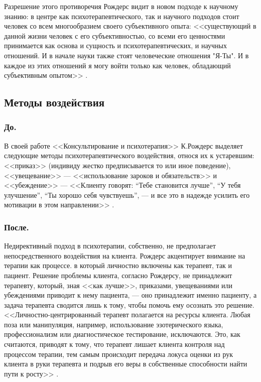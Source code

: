 \documentclass{../../common/thesisbyxetex}
\begin{document}
Разрешение этого противоречия Рождерс видит в новом подходе к научному знанию: в центре как 
психотерапевтического, так и научного подходов стоит человек со всем многообразием своего 
субъективного опыта: <<существующий в данной жизни человек с его субъективностью, со всеми его 
ценностями принимается как основа и сущность и психотерапевтических, и научных отношений. И в начале 
науки также стоят человеческие отношения "Я-Ты". И в каждое из этих отношений я могу войти только 
как человек, обладающий субъективным опытом>> \cite{rogersbec}.

 \subsection*{Методы воздействия}
 
\subsubsection*{До.} В своей работе <<Консультирование и психотерапия>> К.Рождерс выделяет следующие 
методы 
психотерапевтического воздействия, относя их к устаревшим: <<приказ>> (индивиду жестко 
предписывается то или иное поведение), <<увещевание>> --- <<использование зароков и обязательств>> 
\cite[40]{rogersConsult} и <<убеждение>> --- <<Клиенту говорят: “Тебе становится лучше”, “У тебя 
улуч­шение”, “Ты хорошо себя чувствуешь”, — и все это в на­дежде усилить его мотивации в этом 
направлении>> \cite[40]{rogersConsult}. 

\subsubsection*{После.} Недирективный подход в психотерапии, собственно, не предполагает 
непосредственного воздействия на клиента. Рождерс акцентирует внимание на терапии как процессе. в 
который личностно включены как терапевт, так и пациент. Решение проблемы клиента, согласно Рождерсу, 
не принадлежит терапевту, который, зная <<как лучше>>, приказами, увещеваниями или убеждениями 
приводит к нему пациента, --- оно принадлежит именно пациенту, а задача терапевта сводится лишь к 
тому, чтобы помочь ему осознать это решение. <<Личностно-центрированный терапевт полагается на 
ресурсы клиента. Любая поза или манипуляция, например, использование эзотерического языка, 
профессионализм или диагностическое тестирование, исключаются. Это, как считаются, приводят к тому, 
что терапевт лишает клиента контроля над процессом терапии, тем самым происходит передача локуса 
оценки из рук клиента в руки терапевта и подрыв его веры в собственные способности найти пути к 
росту>> \cite{mid}.
\end{document}
